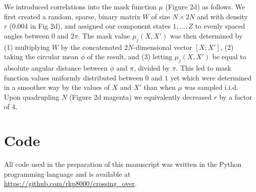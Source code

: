 \documentclass{article}
\begin{document}
\begin{appendices}
We introduced correlations into the mask function $\mu$ (Figure 2d) as follows. We first created a random, sparse, binary matrix $W$ of size $N \times 2N$ and with density $r$ (0.004 in Fig 2d), and assigned our component states $1, ..., Z$ to evenly spaced angles between $0$ and $2\pi$. The mask value $\mu_j(X, X')$ was then determined by (1) multiplying $W$ by the concatenated $2N$-dimensional vector $[X; X']$, (2) taking the circular mean $\phi$ of the result, and (3) letting $\mu_j(X, X')$ be equal to absolute angular distance between $\phi$ and $\pi$, divided by $\pi$. This led to mask function values uniformly distributed between $0$ and $1$ yet which were determined in a smoother way by the values of $X$ and $X'$ than when $\mu$ was sampled i.i.d. Upon quadrupling $N$ (Figure 2d magenta) we equivalently decreased $r$ by a factor of 4.

\section{Code}

All code used in the preparation of this manuscript was written in the Python programming language and is available at \url{https://github.com/rkp8000/crossing_over}.

\end{appendices}







\end{document}
